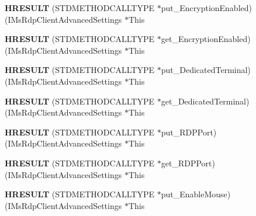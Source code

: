 \begin{DoxyCompactItemize}
\mbox{\label{struct_i_ms_rdp_client_advanced_settings_vtbl_a20bfafdbdfad66a9b0c71624a82c37f3}} 
{\bfseries H\+R\+E\+S\+U\+LT} (S\+T\+D\+M\+E\+T\+H\+O\+D\+C\+A\+L\+L\+T\+Y\+PE $\ast$put\+\_\+\+Encryption\+Enabled)(I\+Ms\+Rdp\+Client\+Advanced\+Settings $\ast$This
\item 
\mbox{\label{struct_i_ms_rdp_client_advanced_settings_vtbl_a68eb7122c2b54db059b795c253e03cb8}} 
{\bfseries H\+R\+E\+S\+U\+LT} (S\+T\+D\+M\+E\+T\+H\+O\+D\+C\+A\+L\+L\+T\+Y\+PE $\ast$get\+\_\+\+Encryption\+Enabled)(I\+Ms\+Rdp\+Client\+Advanced\+Settings $\ast$This
\item 
\mbox{\label{struct_i_ms_rdp_client_advanced_settings_vtbl_a6a3a48647570818cb514e15f63d0fb10}} 
{\bfseries H\+R\+E\+S\+U\+LT} (S\+T\+D\+M\+E\+T\+H\+O\+D\+C\+A\+L\+L\+T\+Y\+PE $\ast$put\+\_\+\+Dedicated\+Terminal)(I\+Ms\+Rdp\+Client\+Advanced\+Settings $\ast$This
\item 
\mbox{\label{struct_i_ms_rdp_client_advanced_settings_vtbl_af6a54e4b15f00903c8cc01e390228160}} 
{\bfseries H\+R\+E\+S\+U\+LT} (S\+T\+D\+M\+E\+T\+H\+O\+D\+C\+A\+L\+L\+T\+Y\+PE $\ast$get\+\_\+\+Dedicated\+Terminal)(I\+Ms\+Rdp\+Client\+Advanced\+Settings $\ast$This
\item 
\mbox{\label{struct_i_ms_rdp_client_advanced_settings_vtbl_a83a7401e0de0995b142c2a0571aa9b78}} 
{\bfseries H\+R\+E\+S\+U\+LT} (S\+T\+D\+M\+E\+T\+H\+O\+D\+C\+A\+L\+L\+T\+Y\+PE $\ast$put\+\_\+\+R\+D\+P\+Port)(I\+Ms\+Rdp\+Client\+Advanced\+Settings $\ast$This
\item 
\mbox{\label{struct_i_ms_rdp_client_advanced_settings_vtbl_a860fd9a5eda52ef87a67a083be35117c}} 
{\bfseries H\+R\+E\+S\+U\+LT} (S\+T\+D\+M\+E\+T\+H\+O\+D\+C\+A\+L\+L\+T\+Y\+PE $\ast$get\+\_\+\+R\+D\+P\+Port)(I\+Ms\+Rdp\+Client\+Advanced\+Settings $\ast$This
\item 
\mbox{\label{struct_i_ms_rdp_client_advanced_settings_vtbl_a13d858f34ae79ca586aa383e41123fc0}} 
{\bfseries H\+R\+E\+S\+U\+LT} (S\+T\+D\+M\+E\+T\+H\+O\+D\+C\+A\+L\+L\+T\+Y\+PE $\ast$put\+\_\+\+Enable\+Mouse)(I\+Ms\+Rdp\+Client\+Advanced\+Settings $\ast$This

\end{DoxyCompactItemize}
